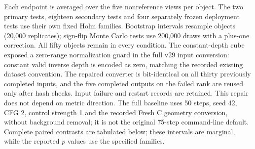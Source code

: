 \documentclass[11pt]{article}
\begin{document}
Each endpoint is averaged over the five nonreference views per object. The two primary tests, eighteen secondary tests and four separately frozen deployment tests use their own fixed Holm families. Bootstrap intervals resample objects (20,000 replicates); sign-flip Monte Carlo tests use 200,000 draws with a plus-one correction. All fifty objects remain in every condition. The constant-depth cube exposed a zero-range normalization guard in the full v29 input conversion: constant valid inverse depth is encoded as zero, matching the recorded existing dataset convention. The repaired converter is bit-identical on all thirty previously completed inputs, and the five completed outputs on the failed rank are reused only after hash checks. Input failure and restart records are retained. This repair does not depend on metric direction. The full baseline uses 50 steps, seed 42, CFG 2, control strength 1 and the recorded Fresh C geometry conversion, without background removal; it is not the original 75-step command-line default. Complete paired contrasts are tabulated below; these intervals are marginal, while the reported $p$ values use the specified families.
\end{document}
